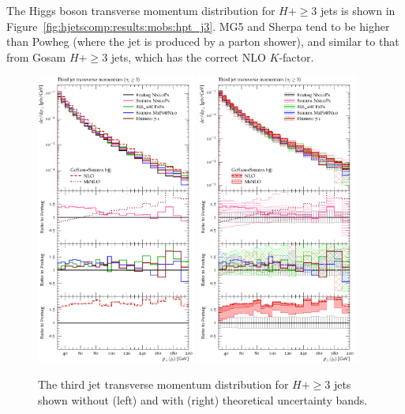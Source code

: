 {The Higgs boson transverse momentum distribution for $H+\ge3$ jets is
shown in Figure~\ref{fig:hjetscomp:results:mobs:hpt_j3}. MG5 and
Sherpa tend to be higher than Powheg (where the jet is produced by a
parton shower), and similar to that from Gosam $H+\ge3$ jets, which
has the correct NLO $K$-factor.

\begin{figure}[t!]
  \centering
  \includegraphics[width=0.47\textwidth]{figures/hjetscomp_u_jet3_pT_incl.pdf}
  \hfill
  \includegraphics[width=0.47\textwidth]{figures/hjetscomp_jet3_pT_incl.pdf}
  \caption{
    The third jet transverse momentum distribution for $H+\ge3$ jets
    shown without (left) and with (right) theoretical uncertainty bands.
    \label{fig:hjetscomp:results:mobs:j3pt}
  }
\end{figure}

}
